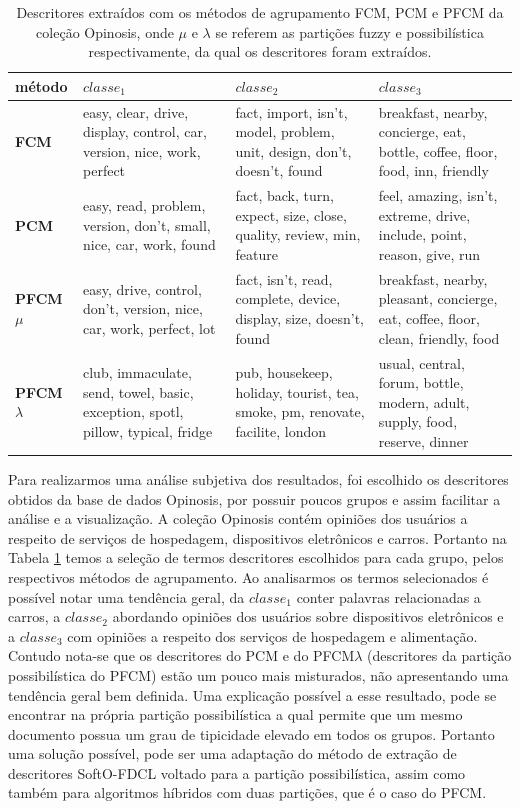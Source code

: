 \begin{table}[!htp]
  \centering
  \begin{tabular}{ |l|p{4cm} | p{4cm} | p{4cm}|}
    \hline
    {\bf método} & $classe_1$ & $classe_2$ & $classe_3$ \\
    \hline
    {\bf FCM} & easy, clear, drive, display, control, car, version, nice, work, perfect & fact,
    import, isn't, model, problem, unit, design, don't, doesn't, found & breakfast, nearby,
    concierge, eat, bottle, coffee, floor, food, inn, friendly \\
    \hline
    {\bf PCM} & easy, read, problem, version, don't, small, nice, car, work, found & fact, back,
    turn, expect, size, close, quality, review, min, feature & feel, amazing, isn't, extreme, drive,
    include, point, reason, give, run\\
    \hline
    {\bf PFCM $\mu$} & easy, drive, control, don't, version, nice, car, work, perfect, lot & fact,
    isn't, read, complete, device, display, size, doesn't, found & breakfast, nearby, pleasant,
    concierge, eat, coffee, floor, clean, friendly, food\\
    \hline
    {\bf PFCM $\lambda$} & club, immaculate, send, towel, basic, exception, spotl, pillow, typical,
    fridge & pub, housekeep, holiday, tourist, tea, smoke, pm, renovate, facilite, london & usual,
    central, forum, bottle, modern, adult, supply, food, reserve, dinner\\
    \hline
  \end{tabular}
  \caption{Descritores extraídos com os métodos de agrupamento FCM, PCM e PFCM da coleção Opinosis,
  onde $\mu$ e $\lambda$ se referem as partições fuzzy e possibilística respectivamente, da qual os
descritores foram extraídos.}
  \label{table:pfcmdescriptors}
\end{table}

Para realizarmos uma análise subjetiva dos resultados, foi escolhido os descritores obtidos da base
de dados Opinosis, por possuir poucos grupos e assim facilitar a análise e a visualização. A coleção
Opinosis contém opiniões dos usuários a respeito de serviços de hospedagem, dispositivos eletrônicos
e carros.  Portanto na Tabela \ref{table:pfcmdescriptors} temos a seleção de termos descritores
escolhidos para cada grupo, pelos respectivos métodos de agrupamento. Ao analisarmos os termos
selecionados é possível notar uma tendência geral, da $classe_1$ conter palavras relacionadas a
carros, a $classe_2$ abordando opiniões dos usuários sobre dispositivos eletrônicos e a $classe_3$
com opiniões a respeito dos serviços de hospedagem e alimentação. Contudo nota-se que os descritores
do PCM e do PFCM$\lambda$ (descritores da partição possibilística do PFCM) estão um pouco mais
misturados, não apresentando uma tendência geral bem definida. Uma explicação possível a esse
resultado, pode se encontrar na própria partição possibilística a qual permite que um mesmo
documento possua um grau de tipicidade elevado em todos os grupos. Portanto uma solução possível,
pode ser uma adaptação do método de extração de descritores SoftO-FDCL voltado para a partição
possibilística, assim como também para algoritmos híbridos com duas partições, que é o caso do PFCM.


